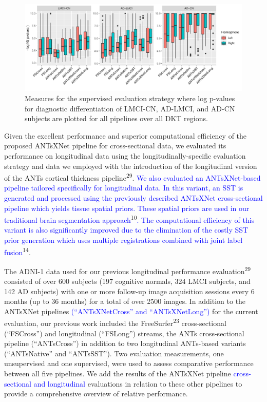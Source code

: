 \documentclass[12pt,]{article}
\begin{document}
\begin{figure}[!htb]
  \centering
    \includegraphics[width=1.0\linewidth]{Figures/logPvalues2.pdf}
  \caption{Measures for the supervised evaluation
  strategy where log p-values for diagnostic
  differentiation of LMCI-CN, AD-LMCI, and AD-CN subjects are plotted for all pipelines
  over all DKT regions. }
  \label{fig:longeval2}
\end{figure}

Given the excellent performance and superior computational efficiency of
the proposed ANTsXNet pipeline for cross-sectional data, we evaluated
its performance on longitudinal data using the longitudinally-specific
evaluation strategy and data we employed with the introduction of the
longitudinal version of the ANTs cortical thickness
pipeline\textsuperscript{29}. \textcolor{blue}{
We also evaluated an ANTsXNet-based pipeline tailored specifically for longitudinal
data.  In this variant, an SST is generated and processed using the previously
described ANTsXNet cross-sectional pipeline which yields tissue spatial priors.
These spatial priors are used in our traditional brain segmentation approach}\textsuperscript{10}\textcolor{blue}{.  The computational efficiency of this variant is also
significantly improved due to the elimination of the costly SST prior generation
which uses multiple registrations combined with joint label fusion}\textsuperscript{14}.

The ADNI-1 data used for our previous longitudinal performance
evaluation\textsuperscript{29} consisted of over 600 subjects (197
cognitive normals, 324 LMCI subjects, and 142 AD subjects) with one or
more follow-up image acquisition sessions every 6 months (up to 36
months) for a total of over 2500 images. In addition to the ANTsXNet
pipelines \textcolor{blue}{(``ANTsXNetCross'' and
``ANTsXNetLong'')} for the current evaluation, our previous work
included the FreeSurfer\textsuperscript{23} cross-sectional
(``FSCross'') and longitudinal (``FSLong'') streams, the ANTs
cross-sectional pipeline (``ANTsCross'') in addition to two longitudinal
ANTs-based variants (``ANTsNative'' and ``ANTsSST''). Two evaluation
measurements, one unsupervised and one supervised, were used to assess
comparative performance between all five pipelines. We add the results
of the ANTsXNet pipeline
\textcolor{blue}{cross-sectional and longitudinal} evaluations in
relation to these other pipelines to provide a comprehensive overview of
relative performance.
\end{document}

